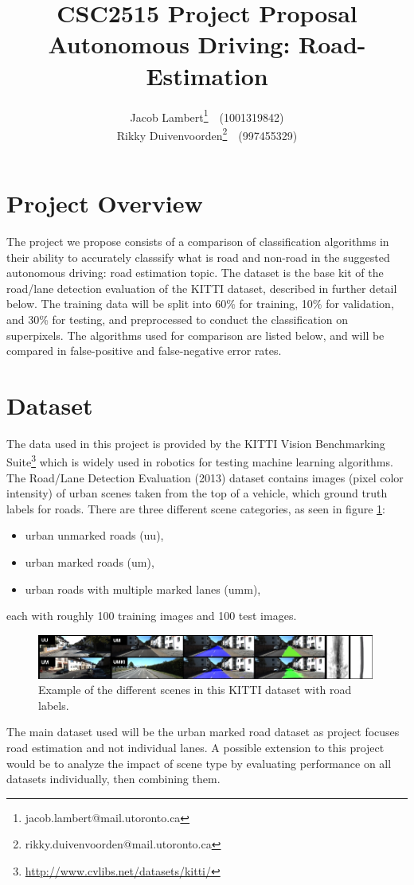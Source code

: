 \documentclass[a4paper,10pt]{article}
\title{\textbf{CSC2515 Project Proposal} \\
Autonomous Driving: Road-Estimation}
\author{
  Jacob Lambert\footnote{jacob.lambert@mail.utoronto.ca}~~(1001319842)\\
  Rikky Duivenvoorden\footnote{rikky.duivenvoorden@mail.utoronto.ca}~~(997455329) \\
}
\date{}
\begin{document}
\maketitle

\section{Project Overview}
The project we propose consists of a comparison of classification algorithms in their ability to accurately classsify what is road and non-road in the suggested autonomous driving: road estimation topic. The dataset is the base kit of the road/lane detection evaluation of the KITTI dataset, described in further detail below. The training data will be split into 60\% for training, 10\% for validation, and 30\% for testing, and preprocessed to conduct the classification on superpixels. The algorithms used for comparison are listed below, and will be compared in false-positive and false-negative error rates.


\section{Dataset}
The data used in this project is provided by the KITTI Vision Benchmarking Suite\footnote{ \url{http://www.cvlibs.net/datasets/kitti/}} which is widely used in robotics for testing machine learning algorithms. The Road/Lane Detection Evaluation (2013) dataset contains images (pixel color intensity) of urban scenes taken from the top of a vehicle, which ground truth labels for roads. There are three different scene categories, as seen in figure \ref{fig:kitti}:
\begin{itemize}
 \item urban unmarked roads (uu),
 \item urban marked roads (um),
 \item urban roads with multiple marked lanes (umm),
\end{itemize}
each with roughly 100 training images and 100 test images.
\begin{figure}[ht!]
 \centering
 \includegraphics[width=0.99\textwidth]{figs/kitti.jpg}
 \caption{Example of the different scenes in this KITTI dataset with road labels.}\label{fig:kitti}
\end{figure}
The main dataset used will be the urban marked road dataset as project focuses road estimation and not individual lanes. A possible extension to this project would be to analyze the impact of scene type by evaluating performance on all datasets individually, then combining them.
\end{document}
